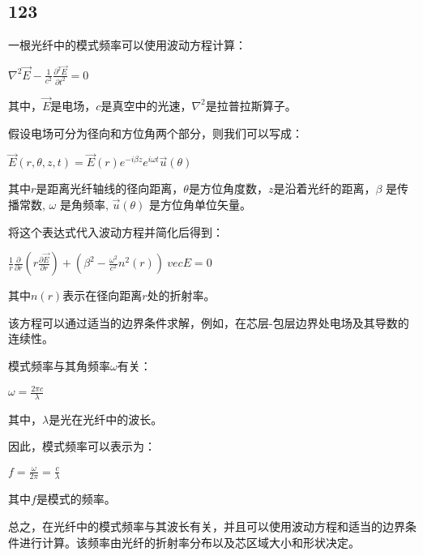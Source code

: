 \documentclass[12pt, a4paper, oneside]{article}
\begin{document}
\begin{spacing}{2.0}
\section{123}
一根光纤中的模式频率可以使用波动方程计算：

$\nabla^2\vec{E}-\frac{1}{c^2}\frac{\partial^2\vec{E}}{\partial t^2} = 0$

其中，$\vec{E}$是电场，$c$是真空中的光速，$\nabla^2$是拉普拉斯算子。

假设电场可分为径向和方位角两个部分，则我们可以写成：

$\vec{E}(r,\theta,z,t)=\vec{E}(r)e^{-i\beta z}e^{i\omega t}\vec{u}(\theta)$

其中$r$是距离光纤轴线的径向距离，$\theta$是方位角度数，$z$是沿着光纤的距离，$\beta$ 是传播常数, $\omega $ 是角频率, $\vec {u } (\theta ) $ 是方位角单位矢量。

将这个表达式代入波动方程并简化后得到：

$
    \frac {1}{r}\frac {\partial }{\partial r}\left(r \frac {\partial \vec {E}}{\partial r }\right)+(\beta ^ 2-\frac {\omega ^ 2}{c ^ 2} n ^ 2 (r)) \ vec { E}=0
$

其中$n(r)$表示在径向距离$r $处的折射率。

该方程可以通过适当的边界条件求解，例如，在芯层-包层边界处电场及其导数的连续性。

模式频率与其角频率$\omega$有关：

$
    \omega =\frac {2\pi c}{\lambda}
$

其中，$\lambda $是光在光纤中的波长。

因此，模式频率可以表示为：

$
    f=\frac {\omega }{2\pi}=\frac {c}{\lambda}
$

其中$f$是模式的频率。

总之，在光纤中的模式频率与其波长有关，并且可以使用波动方程和适当的边界条件进行计算。该频率由光纤的折射率分布以及芯区域大小和形状决定。\\









\end{spacing}{}



\end{document}
